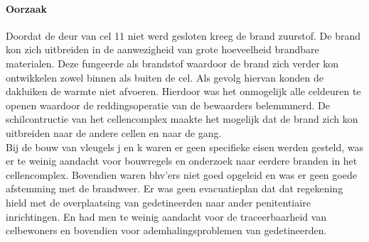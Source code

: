 \documentclass{article}
\begin{document}
	\paragraph{Oorzaak}
	\newline \indent 
	Doordat de deur van cel 11 niet werd gesloten kreeg de brand zuurstof. De brand kon zich  uitbreiden in de aanwezigheid van grote hoeveelheid brandbare materialen.
	Deze fungeerde als brandstof waardoor de brand zich verder kon ontwikkelen zowel binnen als buiten de cel. Als gevolg hiervan konden de dakluiken de warmte niet afvoeren. Hierdoor was het onmogelijk alle celdeuren te openen waardoor de reddingsoperatie van de bewaarders belemmmerd. De schilcontructie van het cellencomplex maakte het mogelijk dat de brand zich kon uitbreiden naar de andere cellen en naar de gang.\\
	Bij de bouw van vleugels j en k waren er geen specifieke eisen werden gesteld, was er te weinig aandacht voor bouwregels en onderzoek naar eerdere branden in het cellencomplex. Bovendien waren bhv'ers niet goed opgeleid en was er geen goede afstemming met de brandweer.
	Er was geen evacuatieplan dat dat regekening hield met de overplaatsing van gedetineerden naar ander penitentiaire inrichtingen. En had men te weinig aandacht voor de traceerbaarheid van celbewoners en bovendien voor ademhalingsproblemen van gedetineerden.
\end{document}
